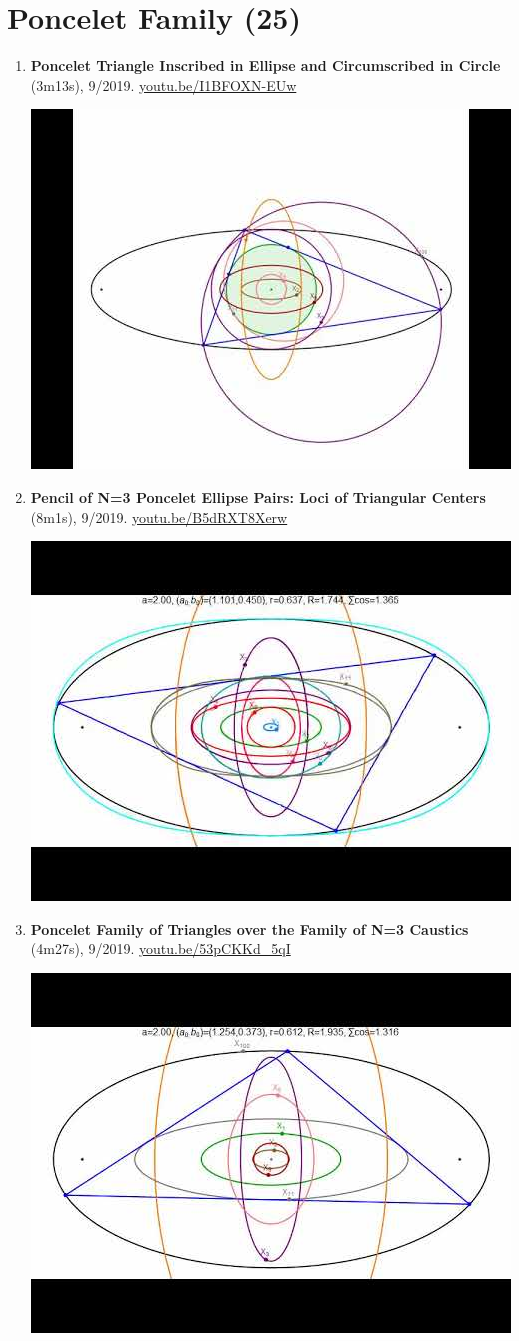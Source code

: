 \documentclass[12pt]{article}
\begin{document}
\section{Poncelet Family (25)}

\begin{enumerate}[resume]
\item \textbf{Poncelet Triangle Inscribed in Ellipse and Circumscribed in Circle} (3m13s), 9/2019. \href{https://youtu.be/I1BFOXN-EUw}{\url{youtu.be/I1BFOXN-EUw}}
\begin{center}\includegraphics[width=.5\textwidth]{pics/I1BFOXN-EUw.jpg}\end{center}
% 
\item \textbf{Pencil of N=3 Poncelet Ellipse Pairs: Loci of Triangular Centers} (8m1s), 9/2019. \href{https://youtu.be/B5dRXT8Xerw}{\url{youtu.be/B5dRXT8Xerw}}
\begin{center}\includegraphics[width=.5\textwidth]{pics/B5dRXT8Xerw.jpg}\end{center}
% 
\item \textbf{Poncelet Family of Triangles over the Family of N=3 Caustics} (4m27s), 9/2019. \href{https://youtu.be/53pCKKd_5qI}{\url{youtu.be/53pCKKd\_5qI}}
\begin{center}\includegraphics[width=.5\textwidth]{pics/53pCKKd_5qI.jpg}\end{center}

\end{enumerate}
\end{document}
